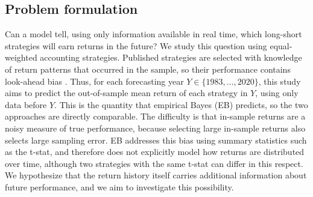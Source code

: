 \documentclass[pdflatex,sn-mathphys-num]{sn-jnl}%
\theoremstyle{thmstyleone}%
\theoremstyle{thmstyletwo}%
\theoremstyle{thmstylethree}%
\begin{document}

\subsection{Problem formulation}\label{subsec2}

Can a model tell, using only information available in real time, which long-short strategies will earn returns in the future? We study this question using equal-weighted accounting strategies. Published strategies are selected with knowledge of return patterns that occurred in the sample, so their performance contains look-ahead bias \cite{chen2025highthroughputassetpricing}. Thus, for each forecasting year $Y \in \{1983, \ldots, 2020\}$, this study aims to predict the out-of-sample mean return of each strategy in $Y$, using only data before $Y$. This is the quantity that empirical Bayes (EB) predicts, so the two approaches are directly comparable. The difficulty is that in-sample returns are a noisy measure of true performance, because selecting large in-sample returns also selects large sampling error. EB addresses this bias using summary statistics such as the t-stat, and therefore does not explicitly model how returns are distributed over time, although two strategies with the same t-stat can differ in this respect. We hypothesize that the return history itself carries additional information about future performance, and we aim to investigate this possibility.
\end{document}
